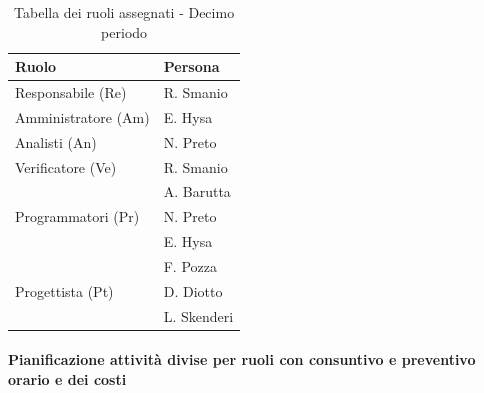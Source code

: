\begin{table}[H]
    \centering
    \begin{tabular}{|L{4cm}|L{2cm}|}
        \hline
        \textbf{Ruolo} & \textbf{Persona} \\
        \hline
        \hline
        Responsabile (Re)   & R. Smanio \\
        \hline
        Amministratore (Am) & E. Hysa \\
        \hline
        Analisti (An)       & N. Preto \\
        \hline
        Verificatore (Ve)   & R. Smanio \\
                            & A. Barutta \\ 
        \hline
        Programmatori (Pr)  & N. Preto \\
                            & E. Hysa \\
                            & F. Pozza \\
        \hline
        Progettista (Pt)    & D. Diotto \\
                            & L. Skenderi \\
        \hline
    \end{tabular}
    \caption{Tabella dei ruoli assegnati - Decimo periodo}
    \label{tab:Ruoli_persone_10}
\end{table}

\paragraph{Pianificazione attività divise per ruoli con consuntivo e preventivo orario e dei costi}

\vspace{0.4cm}

